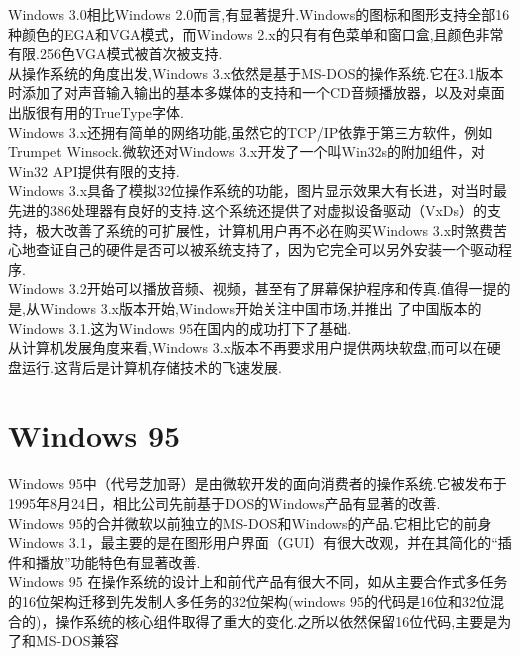 \documentclass[a4paper,12pt,notitlepage]{article}
\begin{document}
	Windows 3.0相比Windows 2.0而言,有显著提升.Windows的图标和图形支持全部16种颜色的EGA和VGA模式，而Windows 2.x的只有有色菜单和窗口盒,且颜色非常有限.256色VGA模式被首次被支持. \\
	
	从操作系统的角度出发,Windows 3.x依然是基于MS-DOS的操作系统.它在3.1版本时添加了对声音输入输出的基本多媒体的支持和一个CD音频播放器，以及对桌面出版很有用的TrueType字体. \\
	
	Windows 3.x还拥有简单的网络功能,虽然它的TCP/IP依靠于第三方软件，例如Trumpet Winsock.微软还对Windows 3.x开发了一个叫Win32s的附加组件，对Win32 API提供有限的支持. \\
	
	Windows 3.x具备了模拟32位操作系统的功能，图片显示效果大有长进，对当时最先进的386处理器有良好的支持.这个系统还提供了对虚拟设备驱动（VxDs）的支持，极大改善了系统的可扩展性，计算机用户再不必在购买Windows 3.x时煞费苦心地查证自己的硬件是否可以被系统支持了，因为它完全可以另外安装一个驱动程序. \\
	
	Windows 3.2开始可以播放音频、视频，甚至有了屏幕保护程序和传真.值得一提的是,从Windows 3.x版本开始,Windows开始关注中国市场,并推出 了中国版本的Windows 3.1.这为Windows 95在国内的成功打下了基础. \\
	
	从计算机发展角度来看,Windows 3.x版本不再要求用户提供两块软盘,而可以在硬盘运行.这背后是计算机存储技术的飞速发展. \\
	
\section{Windows 95}

	Windows 95中（代号芝加哥）是由微软开发的面向消费者的操作系统.它被发布于1995年8月24日，相比公司先前基于DOS的Windows产品有显著的改善. \\

	Windows 95的合并微软以前独立的MS-DOS和Windows的产品.它相比它的前身Windows 3.1，最主要的是在图形用户界面（GUI）有很大改观，并在其简化的“插件和播放”功能特色有显著改善. \\

	Windows 95 在操作系统的设计上和前代产品有很大不同，如从主要合作式多任务的16位架构迁移到先发制人多任务的32位架构(windows 95的代码是16位和32位混合的)，操作系统的核心组件取得了重大的变化.之所以依然保留16位代码,主要是为了和MS-DOS兼容 \\
	
\end{document}

